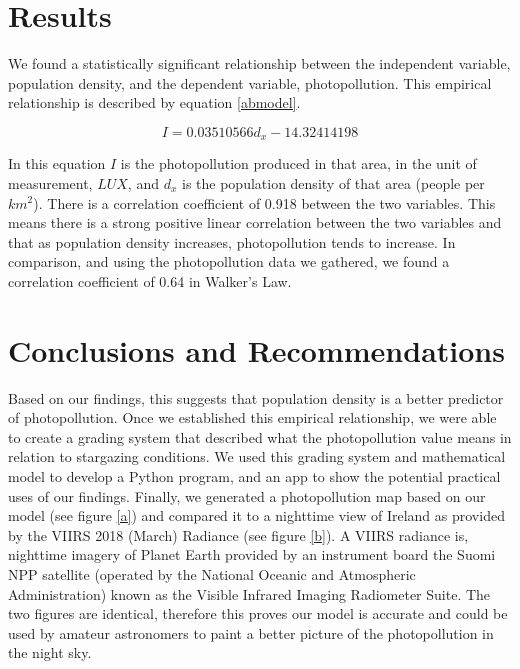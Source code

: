 \documentclass[12pt]{titlepage}
\begin{document}
\section*{Results} 
We found a statistically significant relationship between the independent variable, population density, and the dependent variable, photopollution. This empirical relationship is described by equation \ref{abmodel}. 

\begin{equation} 
\label{abmodel} 
I = 0.03510566 d_x - 14.32414198 
\end{equation} 

In this equation $I$ is the photopollution produced in that area, in the unit of measurement, $LUX$, and $d_x$ is the population density of that area (people per $km^{2}$). There is a correlation coefficient of 0.918 between the two variables. This means there is a strong positive linear correlation between the two variables and that as population density increases, photopollution tends to increase. In comparison, and using the photopollution data we gathered, we found a correlation coefficient of 0.64 in Walker's Law.

\section*{Conclusions and Recommendations} 
Based on our findings, this suggests that population density is a better predictor of  photopollution.  Once we established this empirical relationship, we were able to create a grading system that described what the photopollution value means in relation to stargazing conditions. We used this grading system and mathematical model to develop a Python program, and an app to show the potential practical uses of our findings. Finally, we generated a photopollution map based on our model (see figure \ref{a}) and compared it to a nighttime view of Ireland as provided by the VIIRS 2018 (March) Radiance (see figure \ref{b}). A VIIRS radiance is, nighttime imagery of Planet Earth provided by an instrument board the Suomi NPP satellite (operated by the National Oceanic and Atmospheric Administration) known as the Visible Infrared Imaging Radiometer Suite. The two figures are identical, therefore this proves our model is accurate and could be used by amateur astronomers to paint a better picture of the photopollution in the night sky.
\end{document}
